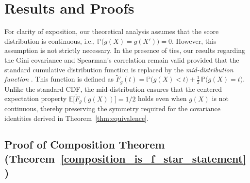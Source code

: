 \documentclass[11pt]{article}
\theoremstyle{plain}
\theoremstyle{plain}
\theoremstyle{plain}
\theoremstyle{plain}
\theoremstyle{plain}
\theoremstyle{plain}
\theoremstyle{plain}
\begin{document}


\appendix
\onecolumn


\section{Results and Proofs}
For clarity of exposition, our theoretical analysis assumes that the score distribution is continuous, i.e., $\mathbb{P}\!\big(g(X)=g(X')\big)=0$. However, this assumption is not strictly necessary. In the presence of ties, our results regarding the Gini covariance and Spearman's correlation remain valid provided that the standard cumulative distribution function is replaced by the \textit{mid-distribution function} \citep{parzen2004quantile}. This function is defined as $\widetilde{F}_g(t)
= \mathbb{P}\!\big(g(X)<t\big) + \frac{1}{2}\,\mathbb{P}\!\big(g(X)=t\big).$ Unlike the standard CDF, the mid-distribution ensures that the centered expectation property $\mathbb{E}\!\big[\widetilde{F}_g(g(X))\big]=1/2$ holds even when $g(X)$ is not continuous, thereby preserving the symmetry required for the covariance identities derived in Theorem~\ref{thm:equivalence}.

\subsection{\textbf{Proof of Composition Theorem 
(Theorem~\ref{composition_is_f_star_statement})}} \label{composition_is_f_star}
\end{document}
